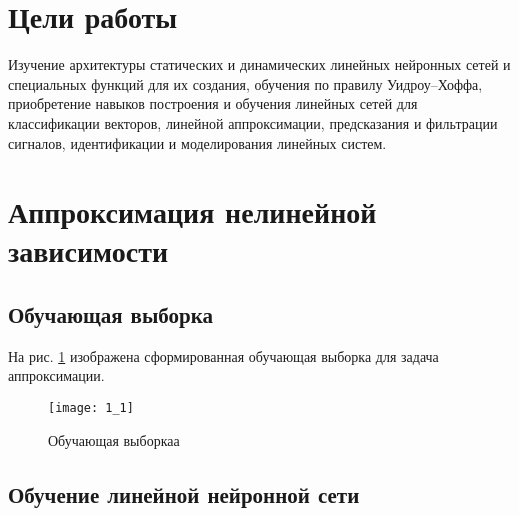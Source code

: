





\tableofcontents
\newpage
\listoffigures
\newpage

\section{Цели работы}

Изучение архитектуры статических и динамических линейных нейронных сетей и специальных функций для их создания, обучения по правилу Уидроу–Хоффа, приобретение навыков построения и обучения линейных сетей для классификации векторов, линейной аппроксимации, предсказания и фильтрации сигналов, идентификации и моделирования линейных систем.

\section{Аппроксимация нелинейной зависимости}

\subsection{Обучающая выборка}


На рис. \ref{fig:1_1} изображена сформированная обучающая выборка для задача аппроксимации.

\begin{figure}[H]
\begin{center}
	\texttt{[image: 1\_1]}
	\caption{Обучающая выборкаа}
	\label{fig:1_1}
\end{center}
\end{figure}

\subsection{Обучение линейной нейронной сети}


